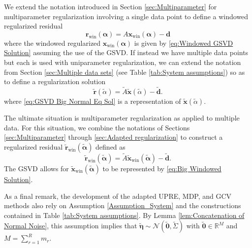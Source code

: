 \documentclass[12pt]{article}
\newcommand{\dVec}{\mathbf{d}}	%
\newcommand{\rVec}{\mathbf{r}}	%
\newcommand{\xVec}{\mathbf{x}}	%
\newcommand{\regparam}{\alpha}  %
\newcommand{\regparamVec}{\bm{\regparam}}   %
\newcommand{\regparamVecBig}{\widetilde{\regparamVec}}   %
\newcommand{\xWin}{\xVec_{\text{win}}}	%
\newcommand{\xBig}{\widetilde{\xVec}}	%
\newcommand{\xWinBig}{\xBig_{\text{win}}}	%
\newcommand{\rBig}{\widetilde{\rVec}}	%
\newcommand{\rWinBig}{\rBig_{\text{win}}}	%
\newcommand{\dBig}{\widetilde{\dVec}}	%
\newcommand{\ABig}{\widetilde{A}}	%
\newcommand{\noise}{\eta}	%
\newcommand{\noiseVec}{\bm{\noise}}	%
\newcommand{\zeroVec}{\bm{0}}	%
\newcommand{\rWin}{\rVec_{\text{win}}}	%
\begin{document}
We extend the notation introduced in Section \ref{sec:Multiparameter} for multiparameter regularization involving a single data point to define a windowed regularized residual
\begin{equation}
\label{eq:Windowed regularized residual}
\rWin(\regparamVec) = A\xWin(\regparamVec) - \dVec
\end{equation}
where the windowed regularized $\xWin(\regparamVec)$ is given by \eqref{eq:Windowed GSVD Solution} assuming the use of the GSVD. If instead we have multiple data points but each is used with uniparameter regularization, we can extend the notation from Section \ref{sec:Multiple data sets} (see Table \ref{tab:System assumptions}) so as to define a regularization solution
\begin{equation}
\label{eq:Big regularized residual}
\rBig(\widetilde{\regparam}) = \ABig\xBig(\widetilde{\regparam}) - \dBig. 
\end{equation}
where \eqref{eq:GSVD Big Normal Eq Sol} is a representation of $\xBig(\widetilde{\regparam})$. \par 
The ultimate situation is multiparameter regularization as applied to multiple data. For this situation, we combine the notations of Sections \ref{sec:Multiparameter} through \ref{sec:Adapted regularization} to construct a regularized residual $\rWinBig(\regparamVecBig)$ defined as
\begin{equation}
\label{eq:Windowed Big regularized residual}
\rWinBig(\regparamVecBig) = \ABig\xWinBig(\regparamVecBig) - \dBig. 
\end{equation}
The GSVD allows for $\xWinBig(\regparamVecBig)$ to be represented by \eqref{eq:Big Windowed Solution}.

As a final remark, the development of the adapted UPRE, MDP, and GCV methods also rely on Assumption \ref{Assumption_System} and the constructions contained in Table \ref{tab:System assumptions}. By Lemma \ref{lem:Concatenation of Normal Noise}, this assumption implies that $\widetilde{\noiseVec} \sim \mathcal{N}\left(\widetilde{\zeroVec},\widetilde{\Sigma}\right)$ with $\widetilde{\zeroVec} \in \mathbb{R}^M$ and $M = \sum_{r=1}^{R} m_r$. 
\end{document}
